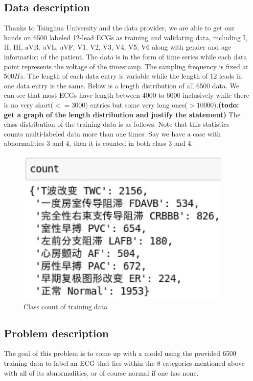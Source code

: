 \documentclass[runningheads]{llncs}
\begin{document}
\subsection{Data description}
Thanks to Tsinghua University and the data provider, we are able to get our hands on 6500 labeled 12-lead ECGs as training and validating data, including I, II, III, aVR, aVL, aVF, V1, V2, V3, V4, V5, V6 along with gender and age information of the patient. The data is in the form of time series while each data point represents the voltage of the timestamp. The sampling frequency is fixed at $500Hz$. The length of each data entry is variable while the length of 12 leads in one data entry is the same. Below is a length distribution of all 6500 data. We can see that most ECGs have length between 4000 to 6000 inclusively while there is no very short($<=3000$) entries but some very long ones($>10000$).\textbf{(todo: get a graph of the length distribution and justify the statement) }
The class distribution of the training data is as follows. Note that this statistics counts multi-labeled data more than one times. Say we have a case with abnormalities 3 and 4, then it is counted in both class 3 and 4.

\begin{center}
	\begin{figure}[H]
		\includegraphics[width=0.65\linewidth]{img/abnormal_count.jpg}
		\caption{\label{fig:class_count} Class count of training data}
	\end{figure}
\end{center}

\subsection{Problem description}
The goal of this problem is to come up with a model using the provided 6500 training data to label an ECG that lies within the 8 categories mentioned above with all of its abnormalities, or of course normal if one has none. 
\end{document}
